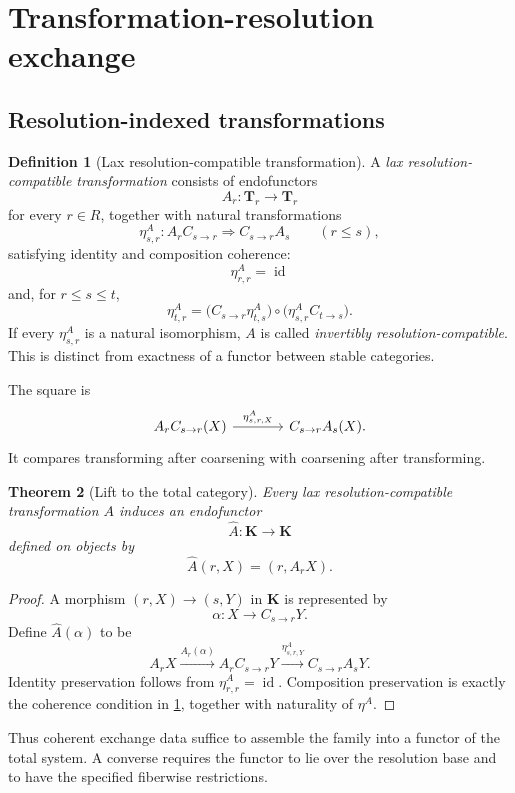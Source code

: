 \documentclass[11pt]{article}
\newtheorem{theorem}{Theorem}[section]
\theoremstyle{definition}
\newtheorem{definition}[theorem]{Definition}
\theoremstyle{remark}
\newcommand{\K}{\mathbf K}
\newcommand{\Tcat}{\mathbf T}
\newcommand{\id}{\operatorname{id}}
\begin{document}
\section{Transformation-resolution exchange}

\subsection{Resolution-indexed transformations}

\begin{definition}[Lax resolution-compatible transformation]\label{def:laxtrans}
A \emph{lax resolution-compatible transformation} consists of endofunctors
\[
A_r:\Tcat_r\to\Tcat_r
\]
for every $r\in R$, together with natural transformations
\[
\eta^A_{s,r}:
A_rC_{s\to r}
\Longrightarrow
C_{s\to r}A_s
\qquad(r\le s),
\]
satisfying identity and composition coherence:
\[
\eta^A_{r,r}=\id
\]
and, for $r\le s\le t$,
\[
\eta^A_{t,r}
=
\bigl(C_{s\to r}\eta^A_{t,s}\bigr)
\circ
\bigl(\eta^A_{s,r}C_{t\to s}\bigr).
\]
If every $\eta^A_{s,r}$ is a natural isomorphism, $A$ is called \emph{invertibly resolution-compatible}. This is distinct from exactness of a functor between stable categories.
\end{definition}

The square is
\[
\begin{tikzcd}[column sep=large,row sep=large]
A_rC_{s\to r}(X) \arrow[r,"\eta^A_{s,r,X}"] & C_{s\to r}A_s(X).
\end{tikzcd}
\]
It compares transforming after coarsening with coarsening after transforming.

\begin{theorem}[Lift to the total category]\label{thm:lift-total}
Every lax resolution-compatible transformation $A$ induces an endofunctor
\[
\widehat A:\K\to\K
\]
defined on objects by
\[
\widehat A(r,X)=(r,A_rX).
\]
\end{theorem}

\begin{proof}
A morphism $(r,X)\to(s,Y)$ in $\K$ is represented by
\[
\alpha:X\to C_{s\to r}Y.
\]
Define $\widehat A(\alpha)$ to be
\[
A_rX
\xrightarrow{A_r(\alpha)}
A_rC_{s\to r}Y
\xrightarrow{\eta^A_{s,r,Y}}
C_{s\to r}A_sY.
\]
Identity preservation follows from $\eta^A_{r,r}=\id$. Composition preservation is exactly the coherence condition in \cref{def:laxtrans}, together with naturality of $\eta^A$.
\end{proof}

Thus coherent exchange data suffice to assemble the family into a functor of the total system. A converse requires the functor to lie over the resolution base and to have the specified fiberwise restrictions.
\end{document}
